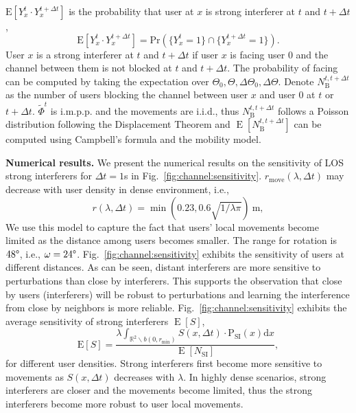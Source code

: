 \documentclass[10pt, conference, letterpaper]{IEEEtran}
\DeclareMathOperator*{\E}{\mathrm{E}}
\begin{document}
$\mathrm{E}[Y_x^t\cdot Y_x^{t + \Delta t}]$ is the probability that user at $x$ is strong interferer at $t$ and $t + \Delta t$,
\begin{equation*}
\mathrm{E}[Y_x^t\cdot Y_x^{t + \Delta t}] = \mathrm{Pr}(\{Y_x^t=1\}\cap \{Y_x^{t+\Delta t}=1\}).
\end{equation*}
User $x$ is a strong interferer at $t$ and $t+\Delta t$ if user $x$ is facing user $0$ and the channel between them is not blocked at $t$ and $t+\Delta t$.
The probability of facing can be computed by taking the expectation over $\Theta_0, \Theta, \Delta \Theta_0, \Delta\Theta$.
Denote $N_\mathrm{B}^{t, t+\Delta t}$ as the number of users blocking the channel between user $x$ and user $0$ at $t$ or $t+\Delta t$. $\tilde{\Phi}^t$ is i.m.p.p. and the movements are i.i.d., thus $N_\mathrm{B}^{t, t+\Delta t}$ follows a Poisson distribution following the Displacement Theorem and $\E[N_\mathrm{B}^{t, t+\Delta t}]$ can be computed using Campbell's formula and the mobility model.


\textbf{Numerical results.}
We present the numerical results on the sensitivity of LOS strong interferers for $\Delta t= 1$s in Fig.~\ref{fig:channel:sensitivity}. 
$r_{\mathrm{move}}(\lambda, \Delta t)$ may decrease with user density in dense environment, i.e., 
\begin{equation*}
r(\lambda,\Delta t) = \min(0.23, 0.6 \sqrt{1/\lambda\pi}) \mathrm{~m},
\end{equation*}
We use this model to capture the fact that users' local movements become limited as the distance among users becomes smaller. 
The range for rotation is $48\degree$, i.e., $\omega = 24\degree$. 
Fig.~\ref{fig:channel:sensitivity} exhibits the sensitivity of users at different distances. 
As can be seen, distant interferers are more sensitive to perturbations than close by interferers. 
This supports the observation that close by users (interferers) will be robust to perturbations and learning the interference from close by neighbors is more reliable. 
Fig.~\ref{fig:channel:sensitivity} exhibits the average sensitivity of strong interferers $\E[S]$,
\begin{equation*}
\mathrm{E}[S] = \frac{\lambda\int_{\mathbb{R}^2\backslash b(0, r_{\min})}S(x,\Delta t)\cdot \mathrm{P_{SI}}(x) \mathrm{d}x}{\E[N_{\mathrm{SI}}]},
\end{equation*}
for different user densities.
Strong interferers first become more sensitive to movements as $S(x, \Delta t)$ decreases with $\lambda$. 
In highly dense scenarios, strong interferers are closer and the movements become limited, thus the strong interferers become more robust to user local movements.
\end{document}
